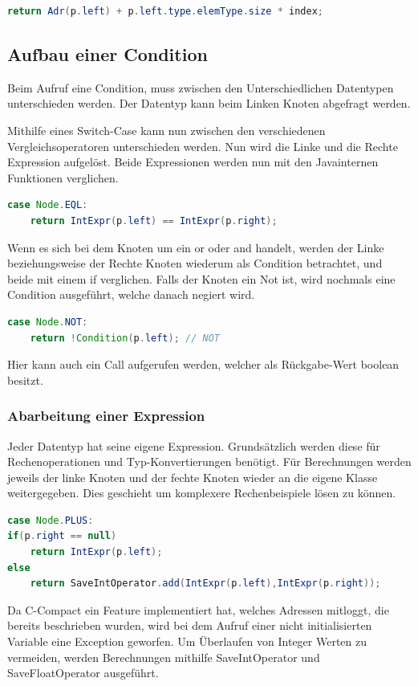 \begin{lstlisting}[language=JAVA]
return Adr(p.left) + p.left.type.elemType.size * index;
\end{lstlisting}

\subsection{Aufbau einer Condition}
Beim Aufruf eine Condition, muss zwischen den Unterschiedlichen Datentypen unterschieden werden. Der Datentyp kann beim Linken Knoten abgefragt werden.

Mithilfe eines Switch-Case kann nun zwischen den verschiedenen Vergleichsoperatoren unterschieden werden. Nun wird die Linke und die Rechte Expression aufgelöst. Beide Expressionen werden nun mit den Javainternen Funktionen verglichen. 
\begin{lstlisting}[language=JAVA]
case Node.EQL:
	return IntExpr(p.left) == IntExpr(p.right);
\end{lstlisting}

Wenn es sich bei dem Knoten um ein or oder and handelt, werden der Linke beziehungsweise der Rechte Knoten wiederum als Condition betrachtet, und beide mit einem if verglichen. Falls der Knoten ein Not ist, wird nochmals eine Condition ausgeführt, welche danach negiert wird.
\begin{lstlisting}[language=JAVA]
case Node.NOT:
	return !Condition(p.left); // NOT
\end{lstlisting}

Hier kann auch ein Call aufgerufen werden, welcher als Rückgabe-Wert boolean besitzt.

\subsubsection{Abarbeitung einer Expression}
Jeder Datentyp hat seine eigene Expression. Grundsätzlich werden diese für Rechenoperationen und Typ-Konvertierungen benötigt. Für Berechnungen werden jeweils der linke Knoten und der fechte Knoten wieder an die eigene Klasse weitergegeben. Dies geschieht um komplexere Rechenbeispiele lösen zu können. 
\begin{lstlisting}[language=JAVA]
case Node.PLUS:
if(p.right == null)
	return IntExpr(p.left);
else
	return SaveIntOperator.add(IntExpr(p.left),IntExpr(p.right));
\end{lstlisting}

Da C-Compact ein Feature implementiert hat, welches Adressen mitloggt, die bereits beschrieben wurden, wird bei dem Aufruf einer nicht initialisierten Variable eine Exception geworfen. Um Überlaufen von Integer Werten zu vermeiden, werden Berechnungen mithilfe SaveIntOperator und SaveFloatOperator ausgeführt.

